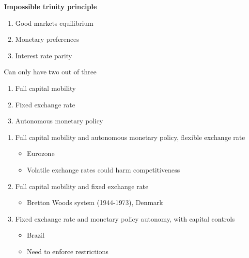 \documentclass{beamer}
\begin{document}
\begin{frame}
  \textbf{Impossible trinity principle}
  \begin{enumerate}
    \item Good markets equilibrium
    \item Monetary preferences
    \item Interest rate parity
  \end{enumerate}
  Can only have two out of three
  \begin{enumerate}
    \item Full capital mobility
    \item Fixed exchange rate
    \item Autonomous monetary policy
  \end{enumerate}
\end{frame}


\begin{frame}
  \begin{enumerate}
    \item Full capital mobility and autonomous monetary policy, flexible exchange rate
    \begin{itemize}
      \item Eurozone
      \item Volatile exchange rates could harm competitiveness
    \end{itemize}
    \item Full capital mobility and fixed exchange rate
    \begin{itemize}
      \item Bretton Woods system (1944-1973), Denmark
    \end{itemize}
    \item Fixed exchange rate and monetary policy autonomy, with capital controls
    \begin{itemize}
      \item Brazil
      \item Need to enforce restrictions
    \end{itemize}
  \end{enumerate}
\end{frame}
\end{document}
